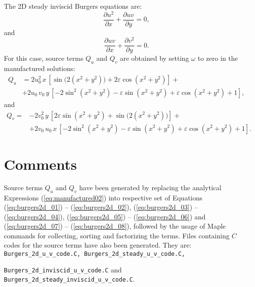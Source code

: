 \documentclass[10pt]{article}
\newcommand{\diff}[2] {\dfrac{\partial #1}{\partial #2}}
\begin{document}
The 2D steady inviscid Burgers  equations are:
\begin{equation}
 \label{eq:burgers2d_07}
 \diff{ u^2 }{x}+\diff{uv}{y}=0,
\end{equation}
and
\begin{equation}
 \label{eq:burgers2d_08}
 \diff{ u v}{x} + \diff{  v^2 }{y}=0. 
\end{equation}
%
For  this case, source terms $Q_u$ and $Q_v$ are  obtained by setting $\omega$ to zero in the manufactured solutions:
\begin{equation}
\begin{split}
Q_u&=2 u_0^2\, x\,[\sin\big(2(x^2+y^2)\big)+2 \varepsilon \cos(x^2+y^2)] +\\
&+  2 u_0 \,v_0\, y\,[-2 \sin^2(x^2+y^2)-\varepsilon \sin(x^2+y^2)+\varepsilon \cos(x^2+y^2)+1],
\end{split}
 \end{equation}
and
\begin{equation}
\begin{split}
Q_v=&-2 v_0^2\, y\,[2 \varepsilon \sin(x^2+y^2)+\sin\big(2(x^2+y^2)\big)] +\\
&+  2 v_0 \,u_0\, x\,[-2 \sin^2(x^2+y^2)-\varepsilon \sin(x^2+y^2)+\varepsilon \cos(x^2+y^2)+1].
 \end{split}
\end{equation}






\section{Comments}

Source terms $Q_u$ and $Q_v$ have been generated by replacing the analytical Expressions (\ref{eq:manufactured02}) into respective set of Equations (\ref{eq:burgers2d_01}) -- (\ref{eq:burgers2d_02}), (\ref{eq:burgers2d_03}) -- (\ref{eq:burgers2d_04}), (\ref{eq:burgers2d_05}) -- (\ref{eq:burgers2d_06}) and (\ref{eq:burgers2d_07}) -- (\ref{eq:burgers2d_08}), followed by the usage of Maple commands for collecting, sorting and factorizing the terms. Files containing $C$ codes for the source terms have also been generated. They are: \texttt{Burgers\_2d\_u\_v\_code.C, Burgers\_2d\_steady\_u\_v\_code.C,}

\noindent \texttt{Burgers\_2d\_inviscid\_u\_v\_code.C} and \texttt{Burgers\_2d\_steady\_inviscid\_u\_v\_code.C}.
\end{document}
